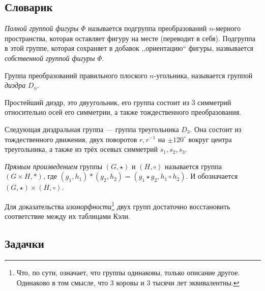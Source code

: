 \documentclass[10pt]{article}
\begin{document}
\subsection*{Словарик}
\begin{bullets}
    \item \emph{Полной группой фигуры} $\Phi$ называется подгруппа преобразований $n$-мерного пространства, которая оставляет фигуру на месте (переводит в себя). Подгруппа в этой группе, которая сохраняет в добавок ,,ориентацию`` фигуры, назвывается \emph{собственной группой фигуры} $\Phi$. 
    \item Группа преобразований правильного плоского $n$-угольника, называется группой \emph{диэдра} $D_n$.
    
    Простейший диэдр, это двуугольник, его группа состоит из 3 симметрий относительно осей его симметрии, а также тождественного преобразования.

    Следующая диэдральная группа --- группа треугольника $D_3$. Она состоит из тождественного движения, двух поворотов $r, r^{-1}$ на $\pm 120^\circ$ вокруг центра треугольника, а также из трёх осевых симметрий $s_1, s_2, s_3$. 

\item \emph{Прямым произведением} группы $(G, \star)$ и $(H, \circ)$ называется группа $(G \times H, *)$, где $(g_1, h_1) * (g_2, h_2) = (g_1 \star g_2, h_1 \circ h_2)$. И обозначается $(G, \star) \times (H, \circ)$.

\item Для доказательства \emph{изоморфности}\footnote{Что, по сути, означает, что группы одинаковы, только описание другое. Одинаково в том смысле, что $3$ коровы и $3$ тысячи лет эквивалентны.} двух групп достаточно восстановить соответствие между их таблицами Кэли.
\end{bullets}

\subsection*{Задачки}

\end{document}
